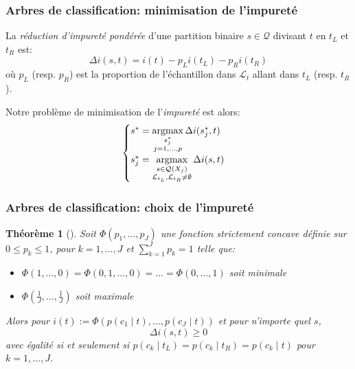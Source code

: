 \documentclass[dvipsnames,10pt]{beamer}
\theoremstyle{plain}
\newtheorem{theoreme}{Théorème}
\theoremstyle{definition}
\begin{document}
\begin{frame}
\frametitle{Arbres de classification: minimisation de l'impureté}
\begin{definition}
    La \emph{réduction d'impureté pondérée} d'une partition binaire $s \in \mathcal{Q}$ divisant $t$ en $t_L$ et $t_R$ est:
    \begin{equation*}
        \Delta i(s,t) = i(t) - p_L i(t_L) - p_R i(t_R)
    \end{equation*}
    où $p_L$ (resp. $p_R$) est la proportion de l'échantillon dans $\mathcal{L}_t$ allant dans $t_L$ (resp. $t_R$).
\end{definition}
Notre problème de minimisation de l'\emph{impureté} est alors:
\begin{equation*}
\begin{cases}
    s^* = \operatornamewithlimits{argmax}\limits_{ \substack{s_j^* \\ j=1,\dotsc,p}} \Delta i(s^*_j,t) \\
    s^*_j = \operatornamewithlimits{argmax}\limits_{\substack{s \in \mathcal{Q}(X_j) \\ \mathcal{L}_{t_L},\mathcal{L}_{t_R} \neq \emptyset}} \Delta i(s,t)
\end{cases}
\end{equation*}
\end{frame}

\begin{frame}
\frametitle{Arbres de classification: choix de l'impureté}
\begin{theoreme}[\cite{Breiman1984a}]
\label{impurete}
    Soit $\Phi (p_1,\dotsc,p_J)$ une fonction strictement concave définie sur $0 \leq p_k \leq 1$, pour $k=1,\dotsc,J$ et $\sum_{k=1}^J p_k = 1$ telle que:
    \begin{itemize}
        \item $\Phi (1,\dotsc,0) = \Phi (0,1,\dotsc,0) = \dots = \Phi ( 0,\dotsc,1)$ soit minimale
        \item $\Phi \left(\frac{1}{J},\dotsc,\frac{1}{J} \right)$ soit maximale
    \end{itemize}
    Alors pour $i(t) := \Phi \left( p(c_1 \mid t), \dotsc, p(c_J \mid t) \right)$ et pour n'importe quel $s$,
    \begin{equation*}
        \Delta i(s,t) \geq 0
    \end{equation*}
    avec égalité si et seulement si $p(c_k \mid t_L) = p(c_k \mid t_R) = p(c_k \mid t)$ pour $k=1,\dotsc,J$.
\end{theoreme}
\end{frame}
\end{document}
